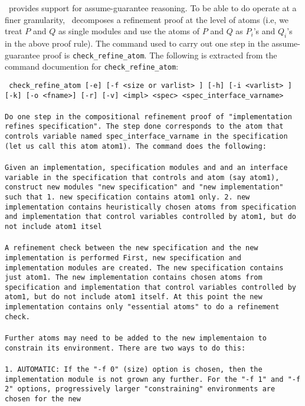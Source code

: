 \mypar
\noindent
\mocha~provides support for assume-guarantee reasoning. 
To be able to do operate at a finer granularity,
\mocha~decomposes a refinement proof at the
level of atoms (i.e, we treat $P$ and $Q$ as single modules and use
the atoms of $P$ and $Q$ as $P_i$'s and $Q_i$'s in the above proof
rule). The command used to carry out one step in the assume-guarantee
proof is {\tt check\_refine\_atom}.
The following is extracted from the command documention for 
{\tt check\_refine\_atom}:


\mypar
\noindent
{\tt
check\_refine\_atom [-e] [-f <size or varlist> ] [-h] [-i <varlist> ] [-k] [-o <fname>] [-r] [-v] <impl> <spec>
<spec\_interface\_varname>  \\
\\
Do one step in the compositional refinement proof of "implementation refines
specification". The step done corresponds to the atom that controls variable
named spec\_interface\_varname in the specification (let us call this atom
atom1). The command does the following:   \\
\\
Given an implementation, specification modules and and an interface variable
in the specification that controls and atom (say atom1), construct new modules
"new specification" and "new implementation" such that 1. new specification
contains atom1 only. 2. new implementation contains heuristically chosen
atoms from specification and implementation that control variables controlled
by atom1, but do not include atom1 itsel\\
\\
A refinement check between the new specification and the new
implementation is performed First, new specification and implementation
modules are created. The new specification contains just atom1. The new
implementation contains chosen atoms from specification and implementation
that control variables controlled by atom1, but do not include atom1 itself. At
this point the new implementation contains only "essential atoms" to do a
refinement check. \\
\\
Further atoms may need to be added to the new implementaion to constrain
its environment. There are two ways to do this:\\
\\
1. AUTOMATIC: If the "-f 0" (size) option is chosen, then the implementation
module is not grown any further. For the "-f 1" and "-f 2" options,
progressively larger "constraining" environments are chosen for the new
}
